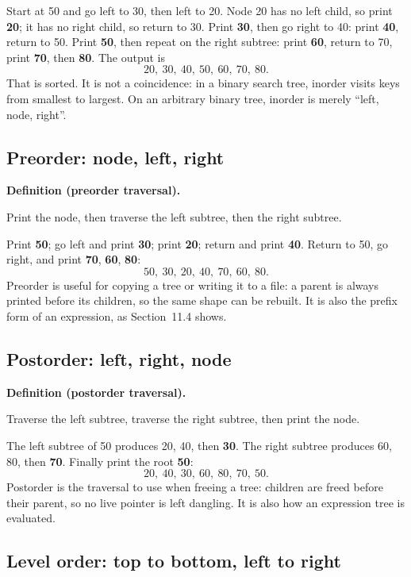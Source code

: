 \documentclass[11pt]{article}
\theoremstyle{definition}
\newenvironment{definitionbox}[1]{%
  \par\noindent\textbf{Definition (#1).}\ \itshape
}{\par\vspace{0.3em}}
\begin{document}
Start at 50 and go left to 30, then left to 20. Node 20 has no left child, so
print \textbf{20}; it has no right child, so return to 30. Print \textbf{30},
then go right to 40: print \textbf{40}, return to 50. Print \textbf{50}, then
repeat on the right subtree: print \textbf{60}, return to 70, print
\textbf{70}, then \textbf{80}. The output is
\[
  20,\ 30,\ 40,\ 50,\ 60,\ 70,\ 80.
\]
That is sorted. It is not a coincidence: in a binary search tree, inorder
visits keys from smallest to largest. On an arbitrary binary tree, inorder is
merely ``left, node, right''.

\subsection{Preorder: node, left, right}

\begin{definitionbox}{preorder traversal}
Print the node, then traverse the left subtree, then the right subtree.
\end{definitionbox}

Print \textbf{50}; go left and print \textbf{30}; print \textbf{20}; return
and print \textbf{40}. Return to 50, go right, and print \textbf{70},
\textbf{60}, \textbf{80}:
\[
  50,\ 30,\ 20,\ 40,\ 70,\ 60,\ 80.
\]
Preorder is useful for copying a tree or writing it to a file: a parent is
always printed before its children, so the same shape can be rebuilt. It is
also the prefix form of an expression, as Section~11.4 shows.

\subsection{Postorder: left, right, node}

\begin{definitionbox}{postorder traversal}
Traverse the left subtree, traverse the right subtree, then print the node.
\end{definitionbox}

The left subtree of 50 produces 20, 40, then \textbf{30}. The right subtree
produces 60, 80, then \textbf{70}. Finally print the root \textbf{50}:
\[
  20,\ 40,\ 30,\ 60,\ 80,\ 70,\ 50.
\]
Postorder is the traversal to use when freeing a tree: children are freed
before their parent, so no live pointer is left dangling. It is also how an
expression tree is evaluated.

\subsection{Level order: top to bottom, left to right}
\end{document}
